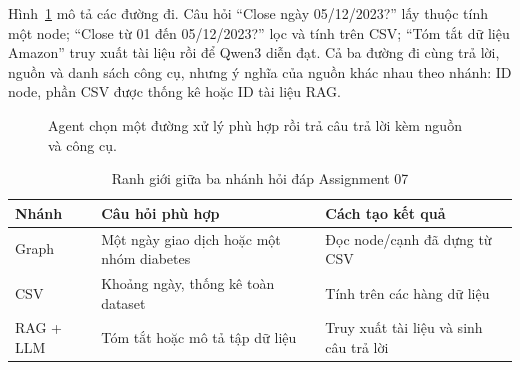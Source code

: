\documentclass[12pt,a4paper]{report}
\begin{document}
Hình~\ref{fig:essay03-agent-flow} mô tả các đường đi. Câu hỏi ``Close ngày 05/12/2023?'' lấy thuộc tính một node; ``Close từ 01 đến 05/12/2023?'' lọc và tính trên CSV; ``Tóm tắt dữ liệu Amazon'' truy xuất tài liệu rồi để Qwen3 diễn đạt. Cả ba đường đi cùng trả lời, nguồn và danh sách công cụ, nhưng ý nghĩa của nguồn khác nhau theo nhánh: ID node, phần CSV được thống kê hoặc ID tài liệu RAG.
\begin{figure}[htbp]\centering\color{red}
\caption{Agent chọn một đường xử lý phù hợp rồi trả câu trả lời kèm nguồn và công cụ.}\label{fig:essay03-agent-flow}
\end{figure}

\begin{table}[htbp]\centering\color{red}
\caption{Ranh giới giữa ba nhánh hỏi đáp Assignment 07}\label{tab:essay03-agent}
\begin{tabularx}{\textwidth}{>{\raggedright\arraybackslash}p{2.4cm}>{\raggedright\arraybackslash}X>{\raggedright\arraybackslash}X}
\toprule
\textbf{Nhánh} & \textbf{Câu hỏi phù hợp} & \textbf{Cách tạo kết quả}\\
\midrule
Graph & Một ngày giao dịch hoặc một nhóm diabetes & Đọc node/cạnh đã dựng từ CSV\\
CSV & Khoảng ngày, thống kê toàn dataset & Tính trên các hàng dữ liệu\\
RAG + LLM & Tóm tắt hoặc mô tả tập dữ liệu & Truy xuất tài liệu và sinh câu trả lời\\
\bottomrule
\end{tabularx}
\end{table}
\end{document}
